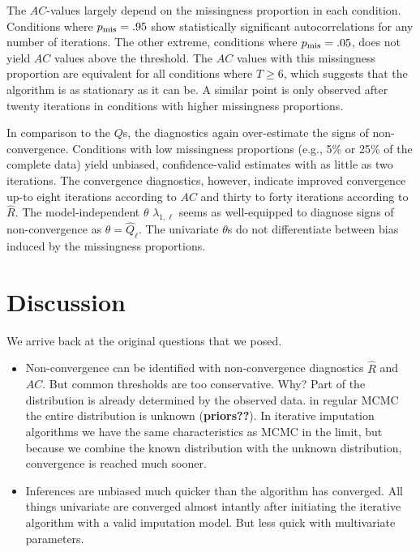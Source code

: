 \documentclass[Royal,times,sageh]{sagej}
\begin{document}
The \(AC\)-values largely depend on the missingness proportion in each condition. Conditions where \(p_{\rm mis}=.95\) show statistically significant autocorrelations for any number of iterations. The other extreme, conditions where \(p_{\rm mis}=.05\), does not yield \(AC\) values above the threshold. The \(AC\) values with this missingness proportion are equivalent for all conditions where \(T\geq6\), which suggests that the algorithm is as stationary as it can be. A similar point is only observed after twenty iterations in conditions with higher missingness proportions.

In comparison to the \(Q\)s, the diagnostics again over-estimate the signs of non-convergence. Conditions with low missingness proportions (e.g., 5\% or 25\% of the complete data) yield unbiased, confidence-valid estimates with as little as two iterations. The convergence diagnostics, however, indicate improved convergence up-to eight iterations according to \(AC\) and thirty to forty iterations according to \(\widehat{R}\). The model-independent \(\theta\) \(\lambda_{1, \ell}\) seems as well-equipped to diagnose signs of non-convergence as \(\theta=\hat{Q}_\ell\). The univariate \(\theta\)s do not differentiate between bias induced by the missingness proportions.

\hypertarget{discussion}{%
\section{Discussion}\label{discussion}}

We arrive back at the original questions that we posed.

\begin{itemize}
\item
  Non-convergence can be identified with non-convergence diagnostics \(\widehat{R}\) and \(AC\). But common thresholds are too conservative. Why? Part of the distribution is already determined by the observed data. in regular MCMC the entire distribution is unknown (\textbf{priors??}). In iterative imputation algorithms we have the same characteristics as MCMC in the limit, but because we combine the known distribution with the unknown distribution, convergence is reached much sooner.
\item
  Inferences are unbiased much quicker than the algorithm has converged. All things univariate are converged almost intantly after initiating the iterative algorithm with a valid imputation model. But less quick with multivariate parameters.
\end{itemize}
\end{document}
